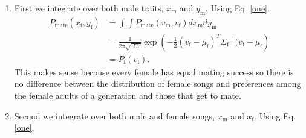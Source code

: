 \documentclass{article}
\newcommand{\x}[1]{\text{#1}}
\begin{document}
\begin{pf}
\begin{enumerate}
\item First we integrate over both male traits, $x_\x{m}$ and $y_\x{m}$. Using Eq. \ref{one},
\begin{align*}
P_\text{mate}(x_\x{f},y_\x{f})&=\int \int P_\text{mate}(v_\x{m},v_\x{f})dx_\x{m}dy_\x{m}
\\&=\frac{1}{2\pi\sqrt{|\Sigma_\x{f}|}}\exp\left(-\frac{1}{2}(v_\x{f}-\mu_\x{f})^T\Sigma_\x{f}^{-1}(v_\x{f}-\mu_\x{f}\right)
\\&=P_\x{f}(v_\x{f}).
\end{align*}
This makes sense because every female has equal mating success so there is no difference between the distribution of female songs and preferences among the female adults of a generation and those that get to mate.
\item Second we integrate over both male and female songs, $x_\x{m}$ and $x_\x{f}$. Using Eq. \ref{one},


\end{enumerate}
\end{pf}
\end{document}
